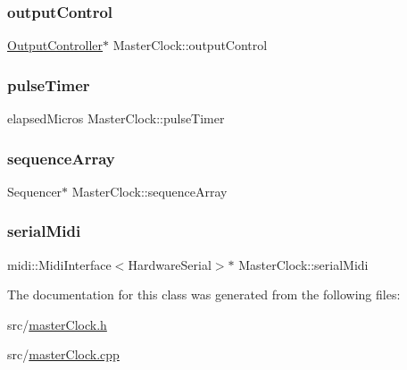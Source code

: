 \subsubsection{\texorpdfstring{output\+Control}{outputControl}}
{\footnotesize\ttfamily \hyperlink{class_output_controller}{Output\+Controller}$\ast$ Master\+Clock\+::output\+Control\hspace{0.3cm}{\ttfamily [private]}}

\mbox{\label{class_master_clock_ad68af6405839bca474e1044548d08f48}} 
\subsubsection{\texorpdfstring{pulse\+Timer}{pulseTimer}}
{\footnotesize\ttfamily elapsed\+Micros Master\+Clock\+::pulse\+Timer}

\mbox{\label{class_master_clock_a5e1a8b89151a6f5698e0ee3a0923e7bb}} 
\subsubsection{\texorpdfstring{sequence\+Array}{sequenceArray}}
{\footnotesize\ttfamily Sequencer$\ast$ Master\+Clock\+::sequence\+Array\hspace{0.3cm}{\ttfamily [private]}}

\mbox{\label{class_master_clock_a4c93dc002c3c69bd93a4b694a9ae0834}} 
\subsubsection{\texorpdfstring{serial\+Midi}{serialMidi}}
{\footnotesize\ttfamily midi\+::\+Midi\+Interface$<$Hardware\+Serial$>$$\ast$ Master\+Clock\+::serial\+Midi\hspace{0.3cm}{\ttfamily [private]}}



The documentation for this class was generated from the following files\+:\begin{DoxyCompactItemize}
\item 
src/\hyperlink{master_clock_8h}{master\+Clock.\+h}\item 
src/\hyperlink{master_clock_8cpp}{master\+Clock.\+cpp}\end{DoxyCompactItemize}

